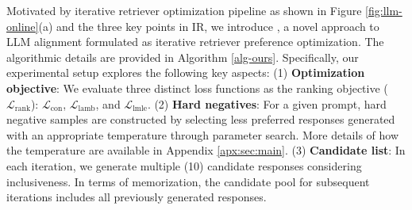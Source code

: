 Motivated by iterative retriever optimization pipeline as shown in Figure \ref{fig:llm-online}(a) and the three key points in IR, we introduce \Ours, a novel approach to LLM alignment formulated as iterative retriever preference optimization.  
The algorithmic details are provided in Algorithm \ref{alg-ours}.  
Specifically, our experimental setup explores the following key aspects:
(1) \textbf{Optimization objective}: We evaluate three distinct loss functions as the ranking objective ($\mathcal{L}_{\text{rank}}$): $\mathcal{L}_{\text{con}}$, $\mathcal{L}_{\text{lamb}}$, and $\mathcal{L}_{\text{lmle}}$.
(2) \textbf{Hard negatives}: For a given prompt, hard negative samples are constructed by selecting less preferred responses generated with an appropriate temperature through parameter search.
More details of how the temperature are available in Appendix \ref{apx:sec:main}.
(3) \textbf{Candidate list}: In each iteration, we generate multiple (10) candidate responses considering inclusiveness.  
In terms of memorization, the candidate pool for subsequent iterations includes all previously generated responses. 

